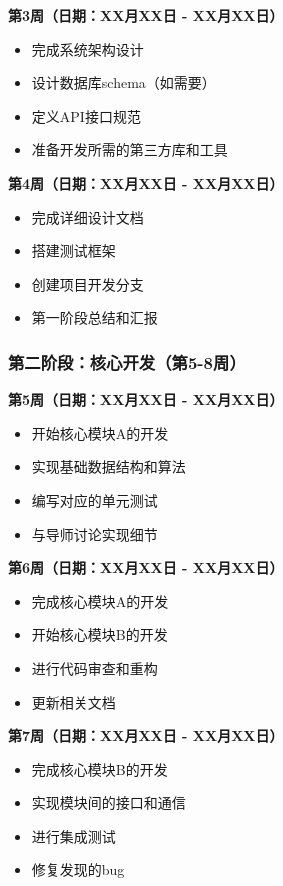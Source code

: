 \documentclass[a4paper,12pt]{article}
\begin{document}
\textbf{第3周（日期：XX月XX日 - XX月XX日）}
\begin{itemize}
    \item 完成系统架构设计
    \item 设计数据库schema（如需要）
    \item 定义API接口规范
    \item 准备开发所需的第三方库和工具
\end{itemize}

\textbf{第4周（日期：XX月XX日 - XX月XX日）}
\begin{itemize}
    \item 完成详细设计文档
    \item 搭建测试框架
    \item 创建项目开发分支
    \item 第一阶段总结和汇报
\end{itemize}

\subsubsection{第二阶段：核心开发（第5-8周）}

\textbf{第5周（日期：XX月XX日 - XX月XX日）}
\begin{itemize}
    \item 开始核心模块A的开发
    \item 实现基础数据结构和算法
    \item 编写对应的单元测试
    \item 与导师讨论实现细节
\end{itemize}

\textbf{第6周（日期：XX月XX日 - XX月XX日）}
\begin{itemize}
    \item 完成核心模块A的开发
    \item 开始核心模块B的开发
    \item 进行代码审查和重构
    \item 更新相关文档
\end{itemize}

\textbf{第7周（日期：XX月XX日 - XX月XX日）}
\begin{itemize}
    \item 完成核心模块B的开发
    \item 实现模块间的接口和通信
    \item 进行集成测试
    \item 修复发现的bug
\end{itemize}
\end{document}
